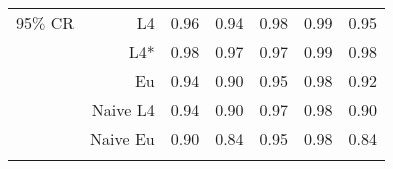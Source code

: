 \documentclass[a4paper,12pt,twoside]{book}
\begin{document}
\begin{table}[H]
\begin{tabular}{crrrrrr}
 {\color{blue} 95$\%$ CR }& L4  &0.96 & 0.94 & 0.98 & 0.99 & 0.95 \\ 
  
 
  &L4*  &   0.98 & 0.97 & 0.97 & 0.99 & 0.98 \\ 
   
&Eu &   0.94 & 0.90 & 0.95 & 0.98 & 0.92 \\ 
 
&Naive L4&   0.94 & 0.90 & 0.97 & 0.98 & 0.90 \\
 
&Naive Eu &    0.90 & 0.84 & 0.95 & 0.98 & 0.84 \\ \\
  
\end{tabular}

\end{table}
\end{document}
